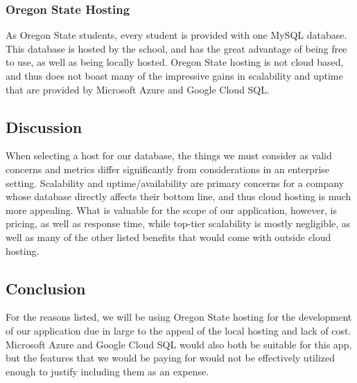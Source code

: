 \documentclass[onecolumn, draftclsnofoot,10pt, compsoc]{IEEEtran}
\begin{document}
 
\subsubsection{Oregon State Hosting}
As Oregon State students, every student is provided with one MySQL database. This database is hosted by the school, and has the great advantage of being free to use, as well as being locally hosted. Oregon State hosting is not cloud based, and thus does not boast many of the impressive gains in scalability and uptime that are provided by Microsoft Azure and Google Cloud SQL.

\subsection{Discussion}
When selecting a host for our database, the things we must consider as valid concerns and metrics differ significantly from considerations in an enterprise setting. Scalability and uptime/availability are primary concerns for a company whose database directly affects their bottom line, and thus cloud hosting is much more appealing. What is valuable for the scope of our application, however, is pricing, as well as response time, while top-tier scalability is mostly negligible, as well as many of the other listed benefits that would come with outside cloud hosting.


\subsection{Conclusion}
For the reasons listed, we will be using Oregon State hosting for the development of our application due in large to the appeal of the local hosting and lack of cost. Microsoft Azure and Google Cloud SQL would also both be suitable for this app, but the features that we would be paying for would not be effectively utilized enough to justify including them as an expense. 
\end{document}
